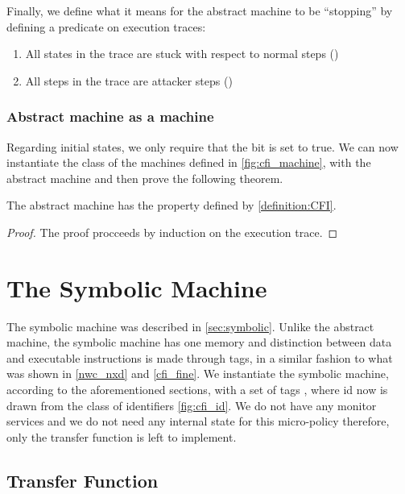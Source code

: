 Finally, we define what it means for the abstract machine to be ``stopping'' by
defining a predicate on execution traces:
\begin{enumerate}
\item All states in the trace are stuck with respect to normal steps (\stepn{}{})
\item All steps in the trace are attacker steps (\stepa{}{})
\end{enumerate}

\subsubsection{Abstract machine as a \CFI machine}\label{abstract_cfi}

Regarding initial states, we only require that the \ok bit is set to true.
We can now instantiate the class of the machines defined in 
\ref{fig:cfi_machine}, with the abstract machine and then prove the following
theorem.

\begin{thm}\label{thm:CFIabstract}
The abstract machine has the \CFI property defined by \ref{definition:CFI}.
\end{thm}

\begin{proof}
The proof procceeds by induction on the execution trace.
\end{proof}


\section{The Symbolic  Machine}\label{sec:symbolic_cfi}

The symbolic machine was described in \ref{sec:symbolic}. Unlike the abstract
machine, the symbolic machine has one memory and distinction between data
and executable instructions is made through tags, in a similar fashion to what
was shown in \ref{nwc_nxd} and \ref{cfi_fine}. We instantiate the symbolic
machine, according to the aforementioned sections, with a set of tags
,
where id now is drawn from the class
of identifiers \ref{fig:cfi_id}. We do not have any monitor services and
we do not need any internal state for this micro-policy therefore, only the
transfer function is left to implement.

\subsection{Transfer Function}\label{sec:transfer_fun}

